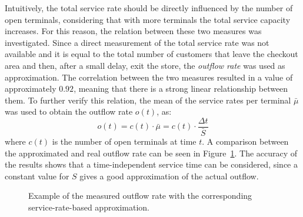 Intuitively, the total service rate should be directly influenced by the number of open terminals, considering that with more terminals the total service capacity increases. For this reason, the relation between these two measures was investigated. Since a direct measurement of the total service rate was not available and it is equal to the total number of customers that leave the checkout area and then, after a small delay, exit the store, the \emph{outflow rate} was used as approximation. The correlation between the two measures resulted in a value of approximately \( 0.92 \), meaning that there is a strong linear relationship between them. To further verify this relation, the mean of the service rates per terminal \( \bar{\mu} \) was used to obtain the outflow rate \( o(t) \), as:
\begin{equation}
  o(t) = c(t) \cdot \bar{\mu} = c(t) \cdot \frac{\Delta t}{\bar{S}}
\end{equation}
where \( c(t) \) is the number of open terminals at time \( t \). A comparison between the approximated and real outflow rate can be seen in Figure~\ref{fig:outflow_approximation}. The accuracy of the results shows that a time-independent service time can be considered, since a constant value for \( S \) gives a good approximation of the actual outflow.

\begin{figure}
  \begin{center}
  \end{center}
  \caption{Example of the measured outflow rate with the corresponding service-rate-based approximation.}
  \label{fig:outflow_approximation}
\end{figure}

\medskip
\clearpage